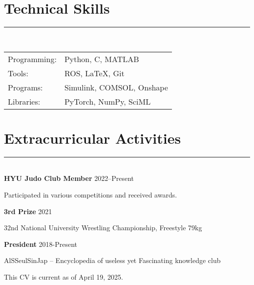\documentclass[11pt,a4paper]{article}
\newcommand{\sectionrule}{\vspace{-0.4em}\noindent\rule{\textwidth}{0.4pt}\\[0.3em]}
\begin{document}
\section*{Technical Skills}\vspace{-1.0em}\sectionrule
\begin{tabular}{@{}ll}
    Programming: & Python, C, MATLAB \\
    Tools: & ROS, LaTeX, Git \\
    Programs: & Simulink, COMSOL, Onshape \\
    Libraries: & PyTorch, NumPy, SciML \\
\end{tabular}

\vspace{0.15cm}

\section*{Extracurricular Activities}\vspace{-1.0em}\sectionrule
\textbf{HYU Judo Club Member} \hfill 2022--Present \\[-1.25em]
\begin{adjustwidth}{2em}{0em}
Participated in various competitions and received awards. \\
\end{adjustwidth}

\noindent\textbf{3rd Prize} \hfill 2021 \\[-1.25em]
\begin{adjustwidth}{2em}{0em}
32nd National University Wrestling Championship, Freestyle 79kg \\
\end{adjustwidth}

\noindent\textbf{President} \hfill 2018-Present \\[-1.25em]
\begin{adjustwidth}{2em}{0em}
AlSSeulSinJap -- Encyclopedia of useless yet Fascinating knowledge club \\
\end{adjustwidth}

\vspace{1em}
\noindent\textcolor{gray!70!black}{\small This CV is current as of April 19, 2025.}
\end{document}
